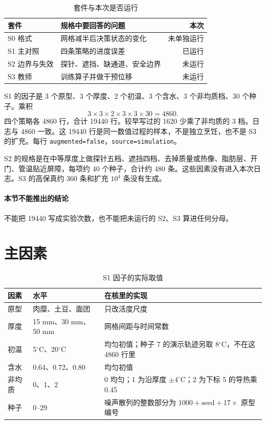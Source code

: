 \begin{table}[ht]
\centering
\caption{套件与本次是否运行}
\begin{tabularx}{\textwidth}{lXr}
\toprule
套件 & 规格中要回答的问题 & 本次 \\
\midrule
S0 格式 & 网格减半后决策状态的变化 & 未单独运行 \\
S1 主对照 & 四条策略的进度误差 & 已运行 \\
S2 边界与失效 & 探针、遮挡、缺通道、安全边界 & 未运行 \\
S3 教师 & 训练算子并做干预位移 & 未运行 \\
\bottomrule
\end{tabularx}
\end{table}

S1 的因子是 3 个原型、3 个厚度、2 个初温、3 个含水、3 个非均质档、30 个种子。乘积
\begin{equation}
3\times 3\times 2\times 3\times 3\times 30=4860.
\end{equation}
四个策略各 4860 行，合计 19440 行。较早写过的 1620 少乘了非均质的 3 档。日志与 4860 一致。这 19440 行是同一数值过程的样本，不是独立烹饪，也不是 S3 的扩充。每行 \texttt{augmented=false}，\texttt{source=simulation}。

S2 的规格是在中等厚度上做探针五档、遮挡四档、去掉质量或热像、脂肪层、开门、管温贴近屏障，每项约 40 个种子，合计约 480 条。这些因素没有进入本次日志。S3 的高保真约 360 条和扩充 \(10^4\) 条没有生成。

\paragraph{本节不能推出的结论}
不能把 19440 写成实验次数，也不能把未运行的 S2、S3 算进任何分母。

\section{主因素}

\begin{table}[ht]
\centering
\caption{S1 因子的实际取值}
\begin{tabularx}{\textwidth}{llX}
\toprule
因素 & 水平 & 在核里的实现 \\
\midrule
原型 & 肉糜、土豆、面团 & 只改活度尺度 \\
厚度 & 15 mm、30 mm、50 mm & 网格间距与时间常数 \\
初温 & 5\(^\circ\mathrm{C}\)、20\(^\circ\mathrm{C}\) & 均匀初值；种子 7 的演示轨迹另取 8\(^\circ\mathrm{C}\)，不在这 4860 行里 \\
含水 & 0.64、0.72、0.80 & 均匀初值 \\
非均质 & 0、1、2 & 0 均匀；1 为沿厚度 \(\pm 4^\circ\mathrm{C}\)；2 为下标 5 的导热乘 0.45 \\
种子 & 0--29 & 噪声散列的整数部分为 \(1000+\mathrm{seed}+17\times\) 原型编号 \\
\bottomrule
\end{tabularx}
\end{table}

